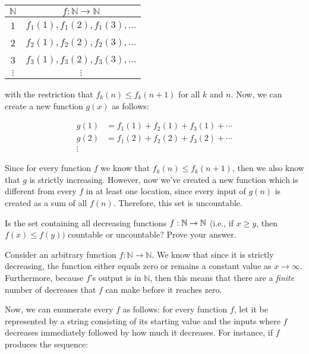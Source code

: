 \documentclass[11pt]{article}
\begin{document}
\begin{Parts}
\begin{solution}
      \begin{center}
        \begin{tabular}{c|c}
          $\mathbb N$ & $f: \mathbb N \to \mathbb N$    \\ \hline
          1                          & $f_1(1), f_1(2), f_1(3), \dots$ \\
          2                          & $f_2(1), f_2(2), f_2(3), \dots$ \\
          3                          & $f_3(1), f_3(2), f_3(3), \dots$ \\
          $\vdots$                   & $\vdots$                       
          \end{tabular}
      \end{center}

      with the restriction that $f_k(n) \le f_k(n+1)$ for all $k$ and $n$. Now, we can create a new function $g(x)$ as follows: 

      \begin{align*}
        g(1) &= f_1(1) + f_2(1) + f_3(1) + \cdots \\
        g(2) &= f_1(2) + f_2(2) + f_3(2) + \cdots\\
        \vdots
      \end{align*}

      Since for every function $f$ we know that $f_k(n) \le f_k(n+1)$, then we also know that $g$ is strictly increasing. However, now we've created a new function which is different from every $f$ in at least one location, since every input of $g(n)$ is created as a sum of all $f(n)$. Therefore, this set is uncountable.
    \end{solution}
    
    \Part
    Is the set containing all decreasing functions $f : \mathbb{N} \rightarrow \mathbb{N}$ (i.e., if $x \geq y$, then $f(x) \leq f(y))$ countable or uncountable? Prove your answer.

    \begin{solution}
      Consider an arbitrary function $f: \mathbb N \to \mathbb N$. We know that since it is strictly decreasing, the function either equals zero or remains a constant value as $x \to \infty$. Furthermore, because $f$'s output is in $\mathbb N$, then this means that there are a \textit{finite} number of decreases that $f$ can make before it reaches zero. 

      Now, we can enumerate every $f$ as follows: for every function $f$, let it be represented by a string consisting of its starting value and the inputs where $f$ decreases immediately followed by how much it decreases. For instance, if $f$ produces the sequence: 


\end{solution}
\end{Parts}
\end{document}
